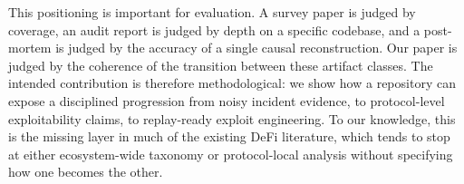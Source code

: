 This positioning is important for evaluation. A survey paper is judged by coverage, an audit report is judged by depth on a specific codebase, and a post-mortem is judged by the accuracy of a single causal reconstruction. Our paper is judged by the coherence of the transition between these artifact classes. The intended contribution is therefore methodological: we show how a repository can expose a disciplined progression from noisy incident evidence, to protocol-level exploitability claims, to replay-ready exploit engineering. To our knowledge, this is the missing layer in much of the existing DeFi literature, which tends to stop at either ecosystem-wide taxonomy or protocol-local analysis without specifying how one becomes the other.
